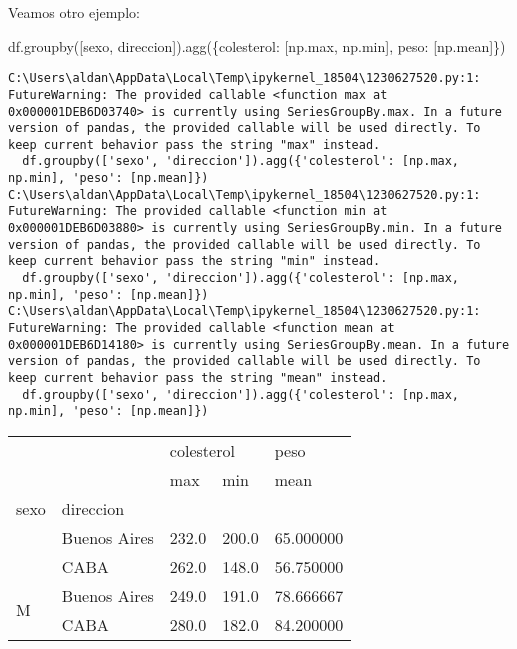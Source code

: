 \documentclass[
  letterpaper,
  DIV=11,
  numbers=noendperiod]{scrreprt}
\newenvironment{Shaded}{\begin{snugshade}}{\end{snugshade}}
\newcommand{\BuiltInTok}[1]{\textcolor[rgb]{0.00,0.23,0.31}{#1}}
\newcommand{\NormalTok}[1]{\textcolor[rgb]{0.00,0.23,0.31}{#1}}
\newcommand{\StringTok}[1]{\textcolor[rgb]{0.13,0.47,0.30}{#1}}
\begin{document}
Veamos otro ejemplo:

\begin{Shaded}
\begin{Highlighting}[]
\NormalTok{df.groupby([}\StringTok{\textquotesingle{}sexo\textquotesingle{}}\NormalTok{, }\StringTok{\textquotesingle{}direccion\textquotesingle{}}\NormalTok{]).agg(\{}\StringTok{\textquotesingle{}colesterol\textquotesingle{}}\NormalTok{: [np.}\BuiltInTok{max}\NormalTok{, np.}\BuiltInTok{min}\NormalTok{], }\StringTok{\textquotesingle{}peso\textquotesingle{}}\NormalTok{: [np.mean]\})}
\end{Highlighting}
\end{Shaded}

\begin{verbatim}
C:\Users\aldan\AppData\Local\Temp\ipykernel_18504\1230627520.py:1: FutureWarning: The provided callable <function max at 0x000001DEB6D03740> is currently using SeriesGroupBy.max. In a future version of pandas, the provided callable will be used directly. To keep current behavior pass the string "max" instead.
  df.groupby(['sexo', 'direccion']).agg({'colesterol': [np.max, np.min], 'peso': [np.mean]})
C:\Users\aldan\AppData\Local\Temp\ipykernel_18504\1230627520.py:1: FutureWarning: The provided callable <function min at 0x000001DEB6D03880> is currently using SeriesGroupBy.min. In a future version of pandas, the provided callable will be used directly. To keep current behavior pass the string "min" instead.
  df.groupby(['sexo', 'direccion']).agg({'colesterol': [np.max, np.min], 'peso': [np.mean]})
C:\Users\aldan\AppData\Local\Temp\ipykernel_18504\1230627520.py:1: FutureWarning: The provided callable <function mean at 0x000001DEB6D14180> is currently using SeriesGroupBy.mean. In a future version of pandas, the provided callable will be used directly. To keep current behavior pass the string "mean" instead.
  df.groupby(['sexo', 'direccion']).agg({'colesterol': [np.max, np.min], 'peso': [np.mean]})
\end{verbatim}

\begin{longtable}[]{@{}lllll@{}}
\toprule\noalign{}
& & \multicolumn{2}{l}{%
colesterol} & peso \\
& & max & min & mean \\
sexo & direccion & & & \\
\midrule\noalign{}
\endhead
\bottomrule\noalign{}
\endlastfoot
\multirow{2}{=}{F} & Buenos Aires & 232.0 & 200.0 & 65.000000 \\
& CABA & 262.0 & 148.0 & 56.750000 \\
\multirow{2}{=}{M} & Buenos Aires & 249.0 & 191.0 & 78.666667 \\
& CABA & 280.0 & 182.0 & 84.200000 \\
\end{longtable}
\end{document}

